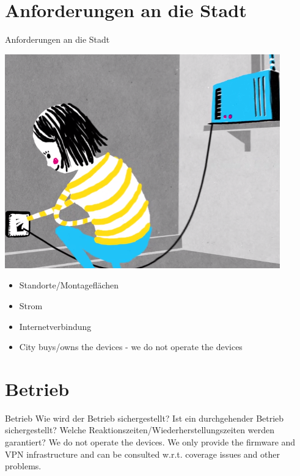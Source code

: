 \documentclass{beamer}
\begin{document}
\section{Anforderungen an die Stadt}
\begin{frame}{Anforderungen an die Stadt}
\vfill
\begin{center}
\includegraphics[height=0.4\textheight]{images/setup}$\;$
\vfill
\end{center}
\begin{itemize}
\item{Standorte/Montageflächen}
\item{Strom}
\item{Internetverbindung}
\item{City buys/owns the devices - we do not operate the devices}
\end{itemize}
\vfill
\end{frame}

\section{Betrieb}
\begin{frame}{Betrieb}
Wie wird der Betrieb sichergestellt?
Ist ein durchgehender Betrieb sichergestellt?
Welche Reaktionszeiten/Wiederherstellungszeiten werden garantiert?
\vfill
We do not operate the devices. We only provide the firmware and VPN infrastructure and can be consulted w.r.t. coverage issues and other problems.
\end{frame}
\end{document}
